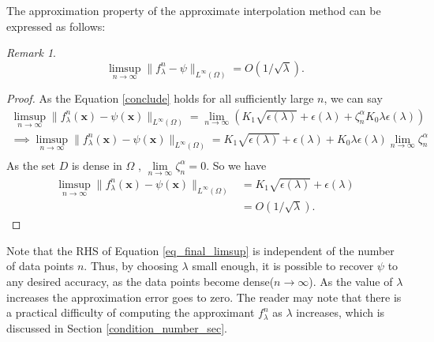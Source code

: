 \documentclass[multixcb]{amstext-l}
\theoremstyle{plain}
\theoremstyle{definition}
\theoremstyle{definition}
\theoremstyle{remark}
\newtheorem{remark}[theorem]{Remark}
\numberwithin{equation}{chapter}
\begin{document}
The approximation property of the approximate interpolation method can be expressed as follows:
\begin{remark}
\begin{equation}
    \limsup\limits_{n\to\infty}\|f^n_{\lambda}-\psi\|_{L^{\infty}(\Omega)} = O(1/\sqrt{\lambda}).
\end{equation}
\end{remark}
\begin{proof}
As the Equation \ref{conclude} holds for all sufficiently large $n$, we can say 
\begin{equation}\label{eq_limsup}\begin{aligned}
    \limsup\limits_{n\to\infty}\| f^n_{\lambda}(\boldsymbol{x}) - \psi(\boldsymbol{x})\|_{L^{\infty}(\Omega)} =  \lim\limits_{n\to\infty}\left(K_1\sqrt{\epsilon(\lambda)} + \epsilon(\lambda) + \zeta_n^{\alpha}K_0\lambda\epsilon(\lambda)\right)\\
    \implies \limsup\limits_{n\to\infty}\| f^n_{\lambda}(\boldsymbol{x}) - \psi(\boldsymbol{x})\|_{L^{\infty}(\Omega)} =  K_1\sqrt{\epsilon(\lambda)} + \epsilon(\lambda) + K_0\lambda\epsilon(\lambda)\lim\limits_{n\to\infty}\zeta_n^{\alpha}\\
    \end{aligned}
\end{equation}As the set $D$ is dense in $\Omega$ , $\lim\limits_{n\to\infty}\zeta_n^{\alpha} = 0$. So we have \begin{equation}\label{eq_final_limsup}\begin{aligned}
\limsup\limits_{n\to\infty}\| f^n_{\lambda}(\boldsymbol{x}) - \psi(\boldsymbol{x})\|_{L^{\infty}(\Omega)} &= K_1\sqrt{\epsilon(\lambda)} + \epsilon(\lambda)\\
&= O(1/\sqrt{\lambda}).
\end{aligned}
\end{equation}
\end{proof}
Note that the RHS of Equation \ref{eq_final_limsup} is independent of the number of data points $n$. Thus, by choosing $\lambda$ small enough, it is possible to recover $\psi$ to any desired accuracy, as the data points become dense($n\to\infty$). As the value of $\lambda$ increases the approximation error goes to zero. The reader may note that there is a practical difficulty of computing the approximant $f^n_{\lambda}$ as $\lambda$ increases, which is discussed in Section \ref{condition_number_sec}.
\end{document}
